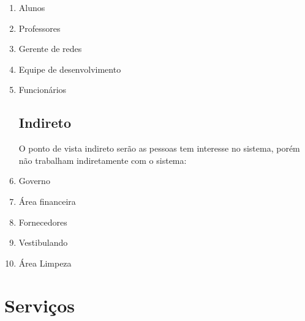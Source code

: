 \begin{enumerate}
\item Alunos
\item Professores
\item Gerente de redes
\item Equipe de desenvolvimento
\item Funcionários

\subsection {Indireto}

O ponto de vista indireto serão as pessoas tem interesse no sistema, porém não trabalham indiretamente com o sistema:

\item Governo
\item Área financeira
\item Fornecedores
\item Vestibulando 
\item Área Limpeza
\end{enumerate}

\section {Serviços}
